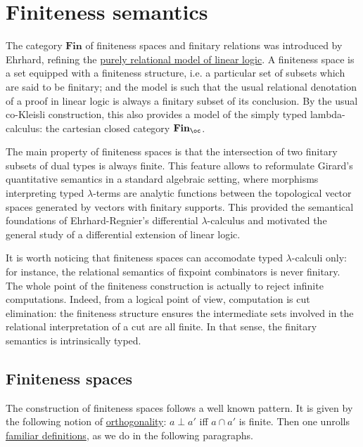 \chapter{Finiteness semantics}\label{finiteness-semantics}

The category \(\mathbf{Fin}\) of finiteness spaces and finitary
relations was introduced by Ehrhard, refining the
\href{relational_semantics}{purely relational model of linear logic}. A
finiteness space is a set equipped with a finiteness structure, i.e. a
particular set of subsets which are said to be finitary; and the model
is such that the usual relational denotation of a proof in linear logic
is always a finitary subset of its conclusion. By the usual co-Kleisli
construction, this also provides a model of the simply typed
lambda-calculus: the cartesian closed category \(\mathbf{Fin}_\oc\).

The main property of finiteness spaces is that the intersection of two
finitary subsets of dual types is always finite. This feature allows to
reformulate Girard's quantitative semantics in a standard algebraic
setting, where morphisms interpreting typed \(\lambda\)-terms are
analytic functions between the topological vector spaces generated by
vectors with finitary supports. This provided the semantical foundations
of Ehrhard-Regnier's differential \(\lambda\)-calculus and motivated the
general study of a differential extension of linear logic.

It is worth noticing that finiteness spaces can accomodate typed
\(\lambda\)-calculi only: for instance, the relational semantics of
fixpoint combinators is never finitary. The whole point of the
finiteness construction is actually to reject infinite computations.
Indeed, from a logical point of view, computation is cut elimination:
the finiteness structure ensures the intermediate sets involved in the
relational interpretation of a cut are all finite. In that sense, the
finitary semantics is intrinsically typed.

\section{Finiteness spaces}\label{finiteness-spaces}

The construction of finiteness spaces follows a well known pattern. It
is given by the following notion of \hyperref[orthogonality-relation]{orthogonality}: \(a\mathrel \bot a'\)
iff \(a\cap a'\) is finite. Then one unrolls
\href{Orthogonality_relation}{familiar definitions}, as we do in the
following paragraphs.

